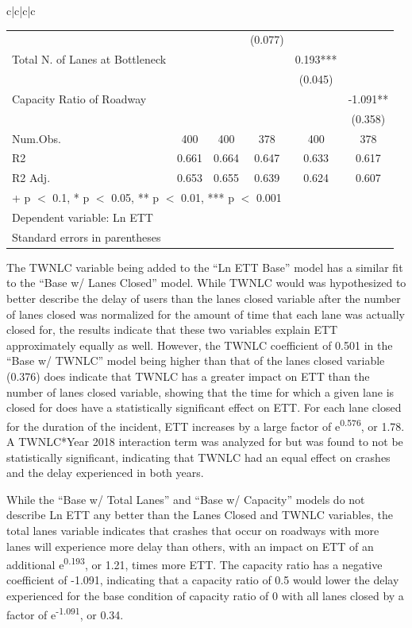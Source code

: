 \documentclass[
  letterpaper,
  authoryear]{elsarticle}
\begin{document}
\begin{table}
{\begin{tabular}[t]{c|c|c|c}
\begin{table}
\begin{table}
{\begin{tabular}[t]{lccccc}
 &  &  & (0.077) &  & \\
Total N. of Lanes at Bottleneck &  &  &  & 0.193*** & \\
 &  &  &  & (0.045) & \\
Capacity Ratio of Roadway &  &  &  &  & -1.091**\\
 &  &  &  &  & (0.358)\\
\midrule
Num.Obs. & 400 & 400 & 378 & 400 & 378\\
R2 & 0.661 & 0.664 & 0.647 & 0.633 & 0.617\\
R2 Adj. & 0.653 & 0.655 & 0.639 & 0.624 & 0.607\\
\bottomrule
\multicolumn{6}{l}{\rule{0pt}{1em}+ p $<$ 0.1, * p $<$ 0.05, ** p $<$ 0.01, *** p $<$ 0.001}\\
\multicolumn{6}{l}{\rule{0pt}{1em}Dependent variable: Ln ETT}\\
\multicolumn{6}{l}{\rule{0pt}{1em}Standard errors in parentheses}\\
\end{tabular}

}

\end{table}%

The TWNLC variable being added to the ``Ln ETT Base'' model has a
similar fit to the ``Base w/ Lanes Closed'' model. While TWNLC would was
hypothesized to better describe the delay of users than the lanes closed
variable after the number of lanes closed was normalized for the amount
of time that each lane was actually closed for, the results indicate
that these two variables explain ETT approximately equally as well.
However, the TWNLC coefficient of 0.501 in the ``Base w/ TWNLC'' model
being higher than that of the lanes closed variable (0.376) does
indicate that TWNLC has a greater impact on ETT than the number of lanes
closed variable, showing that the time for which a given lane is closed
for does have a statistically significant effect on ETT. For each lane
closed for the duration of the incident, ETT increases by a large factor
of e\textsuperscript{0.576}, or 1.78. A TWNLC*Year 2018 interaction term
was analyzed for but was found to not be statistically significant,
indicating that TWNLC had an equal effect on crashes and the delay
experienced in both years.

While the ``Base w/ Total Lanes'' and ``Base w/ Capacity'' models do not
describe Ln ETT any better than the Lanes Closed and TWNLC variables,
the total lanes variable indicates that crashes that occur on roadways
with more lanes will experience more delay than others, with an impact
on ETT of an additional e\textsuperscript{0.193}, or 1.21, times more
ETT. The capacity ratio has a negative coefficient of -1.091, indicating
that a capacity ratio of 0.5 would lower the delay experienced for the
base condition of capacity ratio of 0 with all lanes closed by a factor
of e\textsuperscript{-1.091}, or 0.34.


\end{table}
\end{tabular}}
\end{table}
\end{document}
